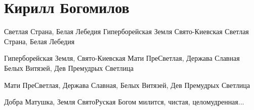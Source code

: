  
 

\section{Кирилл Богомилов}
\label{sec:songs.kirill_bogomilov}

Светлая Страна, Белая Лебедия
Гиперборейская Земля Свято-Киевская
Светлая Страна, Белая Лебедия

Гиперборейская Земля, Свято-Киевская
Мати ПреСветлая, Держава Славная
Белых Витязей,
Дев Премудрых Светлица

Мати ПреСветлая, Держава Славная,
Белых Витязей, 
Дев Премудрых Светлица

Добра Матушка, Земля СвятоРуская
Богом милится, чистая, целомудренная...


